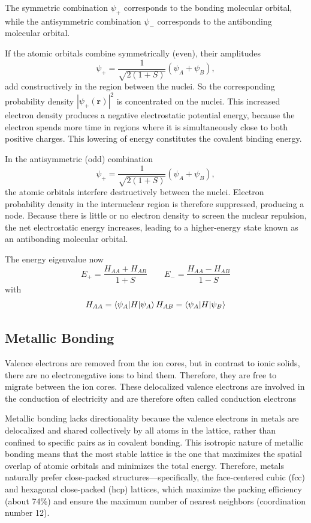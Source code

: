 \documentclass[../../../main.tex]{subfiles}
\begin{document}
The symmetric combination $\psi_{+}$ corresponds to the bonding molecular orbital, while the antisymmetric combination $\psi_{-}$ corresponds to the antibonding molecular orbital.

If the atomic orbitals combine symmetrically (even), their amplitudes
\begin{equation*}
    \psi_{+} = \frac{1}{\sqrt{2(1 + S)}} \left( \psi_A + \psi_B \right),
\end{equation*}
add constructively in the region between the nuclei.
So the corresponding probability density $|\psi_+(\mathbf{r})|^2$ is concentrated on the nuclei.
This increased electron density produces a negative electrostatic potential energy, because the electron spends more time in regions where it is simultaneously close to both positive charges.
This lowering of energy constitutes the covalent binding energy.

In the antisymmetric (odd) combination
\begin{equation*}
    \psi_{+} = \frac{1}{\sqrt{2(1 + S)}} \left( \psi_A + \psi_B \right),
\end{equation*}
the atomic orbitals interfere destructively between the nuclei.
Electron probability density in the internuclear region is therefore suppressed, producing a node.
Because there is little or no electron density to screen the nuclear repulsion, the net electrostatic energy increases, leading to a higher-energy state known as an antibonding molecular orbital.

The energy eigenvalue now 
\begin{equation*}
    E_+=\frac{H_{AA}+H_{AB }}{1+S}
    \qquad
    E_-=\frac{H_{AA}-H_{AB }}{1-S}
\end{equation*}
with 
\begin{equation*}
    H_{AA}=\braket{\psi_A|H|\psi_A}
    H_{AB}=\braket{\psi_A|H|\psi_B}
\end{equation*}

\subsection{Metallic Bonding}
Valence electrons are removed from the ion cores, but in contrast to ionic solids, there are no electronegative ions to bind them. 
Therefore, they are free to migrate between the ion cores. 
These delocalized valence electrons are involved in the conduction of electricity and are therefore often called conduction electrons

Metallic bonding lacks directionality because the valence electrons in metals are delocalized and shared collectively by all atoms in the lattice, rather than confined to specific pairs as in covalent bonding.
This isotropic nature of metallic bonding means that the most stable lattice is the one that maximizes the spatial overlap of atomic orbitals and minimizes the total energy.
Therefore, metals naturally prefer close-packed structures—specifically, the face-centered cubic (fcc) and hexagonal close-packed (hcp) lattices, which maximize the packing efficiency (about 74\%) and ensure the maximum number of nearest neighbors (coordination number 12).
\end{document}
